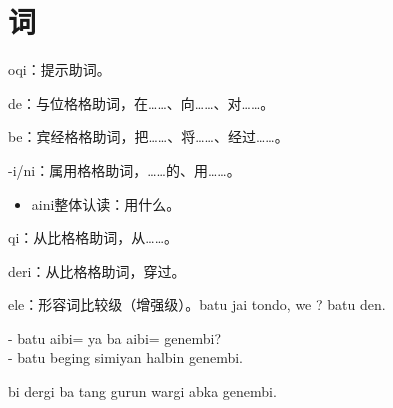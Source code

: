 \section{词}

oqi：提示助词。

de：与位格格助词，在……、向……、对……。

be：宾经格格助词，把……、将……、经过……。

-i/ni：属用格格助词，……的、用……。
\begin{itemize}
    \item aini整体认读：用什么。
\end{itemize}

qi：从比格格助词，从……。

deri：从比格格助词，穿过。

ele：形容词比较级（增强级）。batu jai tondo, we  ? batu  den.

- batu aibi= ya ba  aibi= genembi?\\
- batu beging  simiyan  halbin  genembi.

bi dergi ba   tang gurun  wargi abka      genembi.